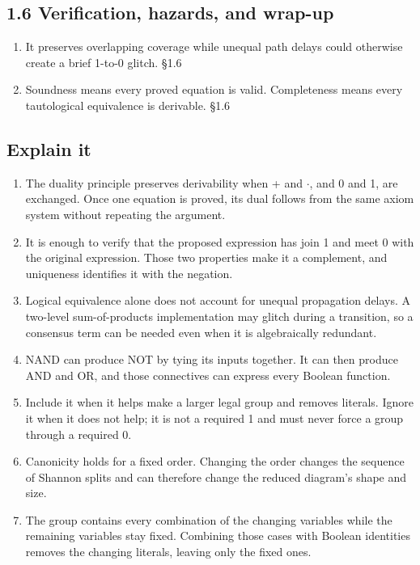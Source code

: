 \documentclass[11pt]{article}
\begin{document}
\begin{keepsection}\subsection{1.6 Verification, hazards, and wrap-up}

\begin{enumerate}
\item It preserves overlapping coverage while unequal path delays could otherwise create a brief 1-to-0 glitch. \hfill{\small\color{FAUblue}§1.6}
\item Soundness means every proved equation is valid. Completeness means every tautological equivalence is derivable. \hfill{\small\color{FAUblue}§1.6}
\end{enumerate}

\end{keepsection}
\begin{keepsection}\subsection{Explain it}

\begin{enumerate}
\item The duality principle preserves derivability when + and \ensuremath{\cdot}, and 0 and 1, are exchanged. Once one equation is proved, its dual follows from the same axiom system without repeating the argument.
\item It is enough to verify that the proposed expression has join 1 and meet 0 with the original expression. Those two properties make it a complement, and uniqueness identifies it with the negation.
\item Logical equivalence alone does not account for unequal propagation delays. A two-level sum-of-products implementation may glitch during a transition, so a consensus term can be needed even when it is algebraically redundant.
\item NAND can produce NOT by tying its inputs together. It can then produce AND and OR, and those connectives can express every Boolean function.
\item Include it when it helps make a larger legal group and removes literals. Ignore it when it does not help; it is not a required 1 and must never force a group through a required 0.
\item Canonicity holds for a fixed order. Changing the order changes the sequence of Shannon splits and can therefore change the reduced diagram’s shape and size.
\item The group contains every combination of the changing variables while the remaining variables stay fixed. Combining those cases with Boolean identities removes the changing literals, leaving only the fixed ones.
\end{enumerate}

\end{keepsection}
\end{document}
